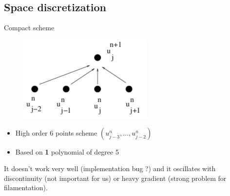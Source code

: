 \documentclass{beamer}
\begin{document}
  \subsection{Space discretization}
\begin{frame}{Compact scheme}
    \begin{figure}
      \centering
      \includegraphics[height=0.4\textheight]{img/carac.png}
    \end{figure}
    \begin{itemize}
      \item High order 6 points scheme $(u^n_{j-3},\dots,u^n_{j-2})$
      \item Based on \textbf{1} polynomial of degree 5
    \end{itemize}
    It doesn't work very well (implementation bug ?) and it oscillates with discontinuity (not important for us) or heavy gradient (strong problem for filamentation).
  \end{frame}
\end{document}
